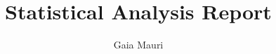 \documentclass[
  letterpaper,
  DIV=11,
  numbers=noendperiod]{scrartcl}
\title{Statistical Analysis Report}
\author{Gaia Mauri}
\date{}
\begin{document}
\maketitle


\subsection{}\label{section}
\end{document}
